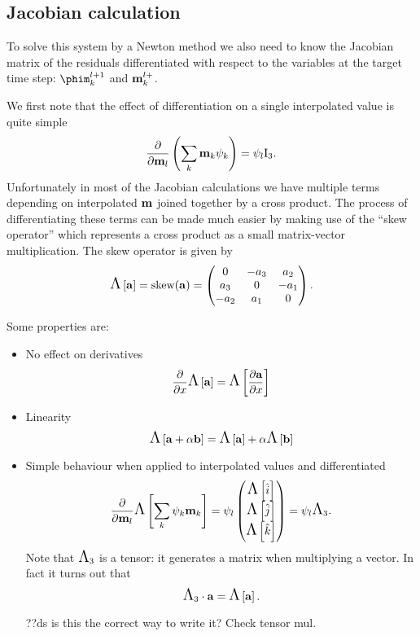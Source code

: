 \subsection{Jacobian calculation}
\label{sec:jacobian-calculation}

To solve this system by a Newton method we also need to know the Jacobian matrix of the residuals differentiated with respect to the variables at the target time step: $\phim_\ik^{\tl+1}$ and $\mathbf{m}_{k}^{l+}$.

We first note that the effect of differentiation on a single interpolated value is quite simple
\begin{equation}
  \frac{\partial }{\partial \mathbf{m}_l} \left( \sum_k \mathbf{m}_k {\psi_k} \right) = \psi_l \text{I}_3.
\end{equation}
Unfortunately in most of the Jacobian calculations we have multiple terms depending on interpolated $\mathbf{m}$ joined together by a cross product.
The process of differentiating these terms can be made much easier by making use of the ``skew operator'' which represents a cross product as a small matrix-vector multiplication.
The skew operator is given by
\begin{equation}
  \text{\Large{$\Lambda$}}\left[ {\mathbf{a}} \right] = \text{skew}({\mathbf{a}}) =
  \begin{pmatrix}
    0 & -a_3 & a_2 \\
    a_3 & 0 & -a_1 \\
    -a_2 & a_1 & 0
  \end{pmatrix}.
  \label{eqn:skew}
\end{equation}

Some properties are:
\begin{itemize}
\item No effect on derivatives
  \begin{equation}
    \frac{\partial }{\partial x} \text{\Large{$\Lambda$}}\left[ {\mathbf{a}} \right] = \text{\Large{$\Lambda$}}\left[  \frac{\partial {\mathbf{a}}}{\partial x}  \right]
  \end{equation}

\item Linearity
  \begin{equation}
    \text{\Large{$\Lambda$}}\left[ {\mathbf{a}} + \alpha {\mathbf{b}} \right] = \text{\Large{$\Lambda$}}\left[ {\mathbf{a}} \right] + \alpha \text{\Large{$\Lambda$}}\left[ {\mathbf{b}} \right]
  \end{equation}

\item Simple behaviour when applied to interpolated values and differentiated
  \begin{equation}
    \frac{\partial }{\partial \mathbf{m}_l} \text{\Large{$\Lambda$}}\left[ \sum_{k} {\psi_k} \mathbf{m}_{k} \right] = \psi_l \begin{pmatrix} \text{\Large{$\Lambda$}}\left[ {\hat{i}} \right] \\ \text{\Large{$\Lambda$}}\left[ {\hat{j}} \right] \\ \text{\Large{$\Lambda$}}\left[ {\hat{k}} \right] \end{pmatrix}
    = \psi_l \text{\Large{$\Lambda$}}_3.
  \end{equation}
  Note that $\text{\Large{$\Lambda$}}_3$ is a tensor: it generates a matrix when multiplying a vector. In fact it turns out that
  \begin{equation}
    \text{\Large{$\Lambda$}}_3 \cdot {\mathbf{a}} = \text{\Large{$\Lambda$}}\left[ {\mathbf{a}} \right].
  \end{equation}

  ??ds is this the correct way to write it? Check tensor mul.
\end{itemize}

